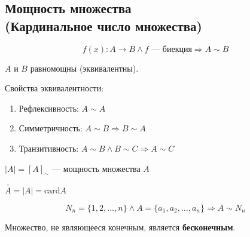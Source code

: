 \documentclass{article}
\begin{document}
\subsection{Мощность множества \\
(Кардинальное число множества)}

\[
f(x): A \to B \land f \text{ --- биекция} \Rightarrow A \sim B
\]

$A$ и $B$ равномощны (эквивалентны).

Свойства эквивалентности:

\begin{enumerate}
	\item Рефлексивность: $A \sim A$
	\item Симметричность: $A \sim B \Rightarrow B \sim A$
	\item Транзитивность: $A \sim B \land B \sim C \Rightarrow A \sim C$
\end{enumerate}

$|A| = [A]_{\sim}$ --- мощность множества $A$

$\overline{\overline{A}} = |A| = \text{card} A$

\[
	N_n = \{1, 2, \dots, n\} \land A = \{a_1, a_2, \dots, a_n \} \Rightarrow A \sim N_n
\]

Множество, не являющееся конечным, является \textbf{бесконечным}.
\end{document}
